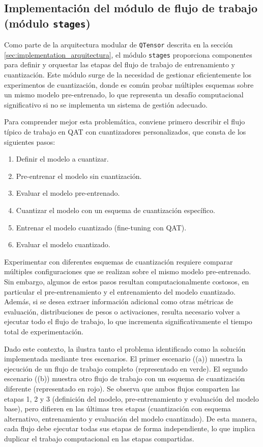 \subsection{Implementación del módulo de flujo de trabajo (módulo \texttt{stages})}
\label{sec:implementation_stages}

Como parte de la arquitectura modular de \texttt{QTensor} descrita en la sección \ref{sec:implementation_arquitectura}, el módulo \texttt{stages} proporciona componentes para definir y orquestar las etapas del flujo de trabajo de entrenamiento y cuantización. Este módulo surge de la necesidad de gestionar eficientemente los experimentos de cuantización, donde es común probar múltiples esquemas sobre un mismo modelo pre-entrenado, lo que representa un desafío computacional significativo si no se implementa un sistema de gestión adecuado.

Para comprender mejor esta problemática, conviene primero describir el flujo típico de trabajo en QAT con cuantizadores personalizados, que consta de los siguientes pasos:

\begin{enumerate}
    \item Definir el modelo a cuantizar.
    \item Pre-entrenar el modelo sin cuantización.
    \item Evaluar el modelo pre-entrenado.
    \item Cuantizar el modelo con un esquema de cuantización específico.
    \item Entrenar el modelo cuantizado (fine-tuning con QAT).
    \item Evaluar el modelo cuantizado.
\end{enumerate}

Experimentar con diferentes esquemas de cuantización requiere comparar múltiples configuraciones que se realizan sobre el mismo modelo pre-entrenado. Sin embargo, algunos de estos pasos resultan computacionalmente costosos, en particular el pre-entrenamiento y el entrenamiento del modelo cuantizado. Además, si se desea extraer información adicional como otras métricas de evaluación, distribuciones de pesos o activaciones, resulta necesario volver a ejecutar todo el flujo de trabajo, lo que incrementa significativamente el tiempo total de experimentación.

Dado este contexto, la  ilustra tanto el problema identificado como la solución implementada mediante tres escenarios. El primer escenario ((a)) muestra la ejecución de un flujo de trabajo completo (representado en verde). El segundo escenario ((b)) muestra otro flujo de trabajo con un esquema de cuantización diferente (representado en rojo). Se observa que ambos flujos comparten las etapas 1, 2 y 3 (definición del modelo, pre-entrenamiento y evaluación del modelo base), pero difieren en las \'ultimas tres etapas (cuantización con esquema alternativo, entrenamiento y evaluación del modelo cuantizado). De esta manera, cada flujo debe ejecutar todas sus etapas de forma independiente, lo que implica duplicar el trabajo computacional en las etapas compartidas.

